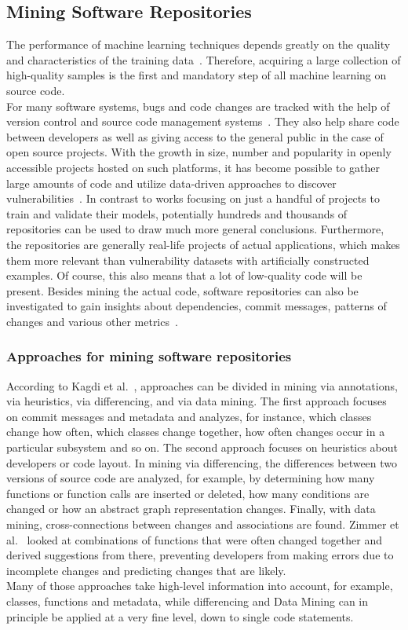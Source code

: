 \documentclass[
a4paper,
pagesize,
pdftex,
12pt,
ngerman,
fleqn,
final,
]{scrartcl}
\begin{document}
	\subsection{Mining Software Repositories}\label{Mining-Software-Repositories}
	The performance of machine learning techniques depends greatly on the quality and characteristics of the training data~\cite{Pang.2015}. Therefore, acquiring a large collection of high-quality samples is the first and mandatory step of all machine learning on source code.\\
	For many software systems, bugs and code changes are tracked with the help of version control and source code management systems~\cite{Zhou.2017}. They also help share code between developers as well as giving access to the general public in the case of open source projects. With the growth in size, number and popularity in openly accessible projects hosted on such platforms, it has become possible to gather large amounts of code and utilize data-driven approaches to discover vulnerabilities~\cite{Russell.2018}. In contrast to works focusing on just a handful of projects to train and validate their models, potentially hundreds and thousands of repositories can be used to draw much more general conclusions. Furthermore, the repositories are generally real-life projects of actual applications, which makes them more relevant than vulnerability datasets with artificially constructed examples. Of course, this also means that a lot of low-quality code will be present. Besides mining the actual code, software repositories can also be investigated to gain insights about dependencies, commit messages, patterns of changes and various other metrics~\cite{Liu.2018}.\\
	\subsubsection{Approaches for mining software repositories}
	According to Kagdi et al.~\cite{Kagdi.2005}, approaches can be divided in mining via annotations, via heuristics, via differencing, and via data mining. The first approach focuses on commit messages and metadata and analyzes, for instance, which classes change how often, which classes change together, how often changes occur in a particular subsystem and so on. The second approach focuses on heuristics about developers or code layout. In mining via differencing, the differences between two versions of source code are analyzed, for example, by determining how many functions or function calls are inserted or deleted, how many conditions are changed or how an abstract graph representation changes. Finally, with data mining, cross-connections between changes and associations are found. Zimmer et al.~\cite{Zimmermann.2005} looked at combinations of functions that were often changed together and derived suggestions from there, preventing developers from making errors due to incomplete changes and predicting changes that are likely.\\
	Many of those approaches take high-level information into account, for example, classes, functions and metadata, while differencing and Data Mining can in principle be applied at a very fine level, down to single code statements.
\end{document}
